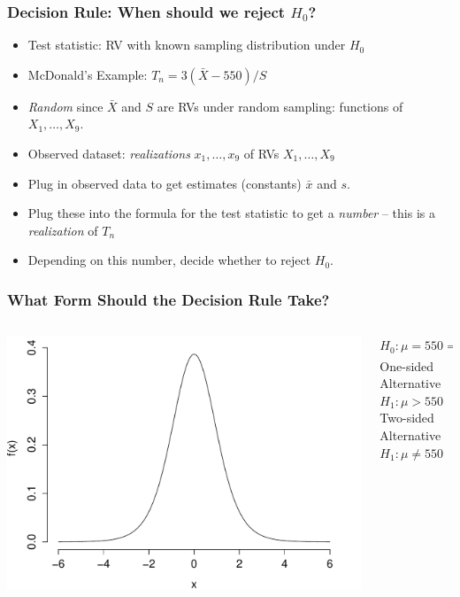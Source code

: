 \documentclass[handout]{beamer}
\begin{document}
\begin{frame}
	\frametitle{Decision Rule: When should we reject $H_0$?}
	\begin{itemize}
		\item Test statistic: RV with known sampling distribution under $H_0$
		\item McDonald's Example: $T_n = 3(\bar{X} - 550)/S$
		\item \emph{Random} since $\bar{X}$ and $S$ are RVs under random sampling: functions of $X_1, \hdots, X_9$.
		\item Observed dataset: \emph{realizations} $x_1, \hdots, x_9$ of RVs $X_1, \hdots, X_9$
		\item Plug in observed data to get estimates (constants) $\bar{x}$ and $s$.
		\item Plug these into the formula for the test statistic to get a \emph{number} -- this is a \emph{realization} of $T_n$ 
		\item Depending on this number, decide whether to reject $H_0$.
	\end{itemize}
\end{frame}
\begin{frame}
\frametitle{What Form Should the Decision Rule Take?}
\begin{columns}
\begin{column}[l]{6cm}
\includegraphics[scale = 0.5]{./images/t_pdf}
\end{column}

\begin{column}[r]{6cm}
$H_0\colon \mu=550 \Rightarrow \displaystyle \frac{\bar{X} - 550}{S/3} \sim t(8)$\\ \pause
\vspace{1em}
One-sided Alternative $H_1\colon \mu > 550$\\ \pause
\vspace{1em}
Two-sided Alternative $H_1\colon \mu \neq 550$ 
\end{column}

\end{columns}
 
\end{frame}
\end{document}
